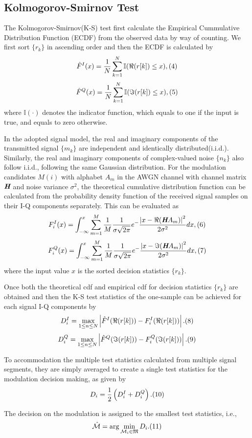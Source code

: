 \documentclass[conference]{IEEEtran}
\begin{document}
\subsection{ Kolmogorov-Smirnov Test}
The Kolmogorov-Smirnov(K-S) test first calculate the Empirical Cummulative Distribution Function (ECDF) from the observed data by way of counting\cite{Kolmogorov}. We first sort $\{r_k\}$ in ascending order and then the ECDF is calculated by
$$\hat{F}^{I}(x)=\frac{1}{N}\sum_{k=1}^{N}\mathbb{I}(\Re(r[k])\leq x),\relax{(4)}$$
$$\hat{F}^{Q}(x)=\frac{1}{N}\sum_{k=1}^{N}\mathbb{I}(\Im(r[k])\leq x),\relax{(5)}$$
where $\mathbb{I}(\cdot)$ denotes the indicator function, which equals to one if the input is true, and equals to zero otherwise.\par
In the adopted signal model, the real and imaginary components of the transmitted signal $\{m_k\}$ are independent and identically distributed(i.i.d.). Similarly, the real and imaginary components of complex-valued noise $\{n_k\}$ also follow i.i.d., following the same Gaussian distribution. For the modulation candidates $M(i)$ with alphabet $A_m$ in the AWGN channel with channel matrix $\emph{\textbf{H}}$ and noise variance $\sigma^2$, the theoretical cumulative distribution function can be calculated from the probability density function of the received signal samples on their I-Q components separately. This can be evaluated as
$$F_i^I(x)=\int_{-\infty}^{x}\sum_{m=1}^{M}\frac{1}{M}\frac{1}{\sigma\sqrt{2\pi}}e^-\frac{\left|x-\Re(\emph{\textbf{H}}{A_m})\right|^2}{2\sigma^2}dx,
\relax{(6)}$$
$$F_i^Q(x)=\int_{-\infty}^{x}\sum_{m=1}^{M}\frac{1}{M}\frac{1}{\sigma\sqrt{2\pi}}e^-\frac{\left|x-\Im(\emph{\textbf{H}}{A_m})\right|^2}{2\sigma^2}dx,
\relax{(7)}$$
where the input value $x$ is the sorted decision statistics $\{r_k\}$.
\par Once both the theoretical cdf and empirical cdf for decision statistics $\{r_k\}$ are obtained and then the K-S test statistics of the one-sample can be achieved for each signal I-Q components by
$$D_i^I=\max_{1\leq n \leq N}\left|\hat{F}^{I}(\Re(r[k]))-F_{i}^{I}(\Re(r[k]))\right|.\relax{(8)}$$
$$D_i^Q=\max_{1\leq n \leq N}\left|\hat{F}^{Q}(\Im(r[k]))-F_{i}^{Q}(\Im(r[k]))\right|.\relax{(9)}$$
\par To accommodation the multiple test statistics calculated from multiple signal segments, they are simply averaged to create a single test statistics for the modulation decision making, as given by
$$D_i=\frac{1}{2}\left(D_i^I+D_i^Q\right).\relax{(10)}$$
\par The decision on the modulation is assigned to the smallest test statistics, i.e.,
$$\hat{\mathcal{M}}=\arg\min_{\mathcal{M}_{i}\in \mathfrak{M}}D_{i}.\relax{(11)}$$
\end{document}
